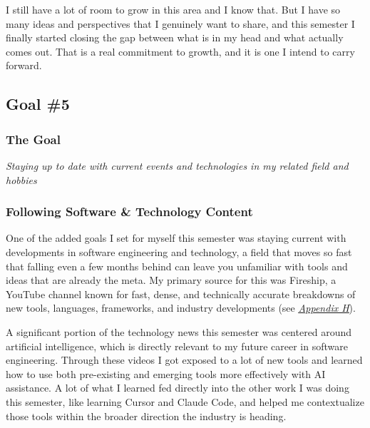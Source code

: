 \documentclass[12pt]{article}
\let\oldhyperref\hyperref
\renewcommand{\hyperref}[2][]{\oldhyperref[#1]{\textit{\uline{#2}}}}
\begin{document}
            I still have a lot of room to grow in this area and I know that. But I have so many ideas and perspectives that I genuinely want to share, and this semester I finally started closing the gap between what is in my head and what actually comes out. That is a real commitment to growth, and it is one I intend to carry forward.

        \subsection{Goal \#5}

            \subsubsection*{The Goal}
            \textit{Staying up to date with current events and technologies in my related field and hobbies}

            \subsubsection{Following Software \& Technology Content}
            \label{sec:following-software}

            One of the added goals I set for myself this semester was staying current with developments in software engineering and technology, a field that moves so fast that falling even a few months behind can leave you unfamiliar with tools and ideas that are already the meta. My primary source for this was Fireship, a YouTube channel known for fast, dense, and technically accurate breakdowns of new tools, languages, frameworks, and industry developments (see \hyperref[appendix:h]{Appendix H}).

            A significant portion of the technology news this semester was centered around artificial intelligence, which is directly relevant to my future career in software engineering. Through these videos I got exposed to a lot of new tools and learned how to use both pre-existing and emerging tools more effectively with AI assistance. A lot of what I learned fed directly into the other work I was doing this semester, like learning Cursor and Claude Code, and helped me contextualize those tools within the broader direction the industry is heading.
\end{document}
